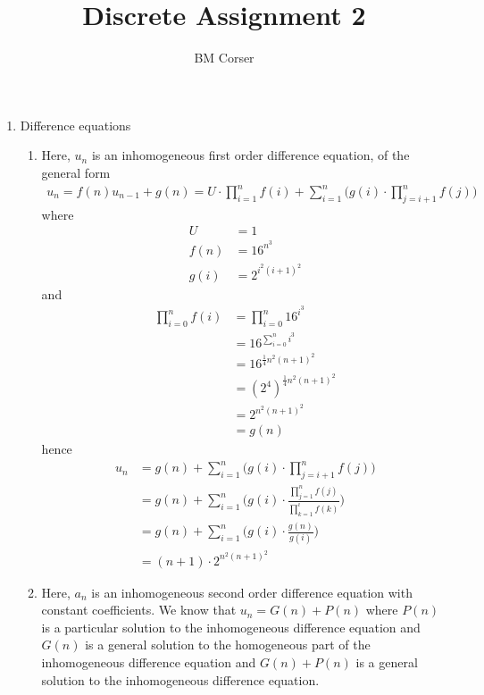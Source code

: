 \documentclass[10pt]{article}
\author{BM Corser}
\title{Discrete Assignment 2}
\date{}
\begin{document}
    \maketitle 
    \begin{enumerate}
        \item Difference equations
        \begin{enumerate}
            \item Here, $u_n$ is an inhomogeneous first order difference
                equation, of the general form
                \begin{align*}
                    u_n = f(n)u_{n - 1} + g(n)
                        = U \cdot \prod_{i = 1}^n f(i) + \sum_{i = 1}^n\Bigg(g(i) \cdot \prod_{j = i + 1}^n f(j) \Bigg)
                \end{align*}
                where
                \begin{align*}
                    U &= 1 \\
                    f(n) &= 16^{n^3} \\
                    g(i) &= 2^{i^2(i + 1)^2}
                \end{align*}
                and
                \begin{align*}
                    \prod_{i = 0}^nf(i) &= \prod_{i = 0}^n16^{i^3} \\
                     &= 16^{\sum_{i = 0}^ni^3} \\
                     &= 16^{\frac{1}{4}n^2(n + 1)^2} \\
                     &= (2^4)^{\frac{1}{4}n^2(n + 1)^2} \\
                     &= 2^{n^2(n + 1)^2} \\
                     &= g(n)
                \end{align*}
                hence
                \begin{align*}
                    u_n &= g(n) + \sum_{i = 1}^n\Bigg(g(i) \cdot \prod_{j = i + 1}^n f(j) \Bigg) \\
                    &= g(n) + \sum_{i = 1}^n\Bigg(g(i) \cdot \frac{\prod_{j = 1}^n f(j)}{\prod_{k = 1}^i f(k)} \Bigg) \\
                    &= g(n) + \sum_{i = 1}^n\Bigg(g(i) \cdot \frac{g(n)}{g(i)} \Bigg) \\
                    &= (n + 1)\cdot 2^{n^2(n + 1)^2}
                \end{align*}
            \item Here, $a_n$ is an inhomogeneous second order difference
                equation with constant coefficients. We know that $u_n = G(n) +
                P(n)$ where $P(n)$ is a particular solution to the
                inhomogeneous difference equation and $G(n)$ is a general
                solution to the homogeneous part of the inhomogeneous
                difference equation and $G(n) + P(n)$ is a general solution to
                the inhomogeneous difference equation.


\end{enumerate}
\end{enumerate}
\end{document}
